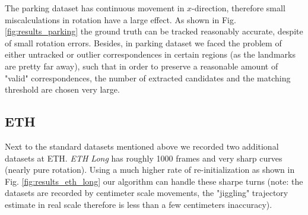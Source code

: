 \documentclass[letterpaper, 12 pt]{article}
\begin{document}
\begin{multicols*}{2}
The parking dataset has continuous movement in $x$-direction, therefore small miscalculations in rotation have a large effect. As shown in Fig. \ref{fig:results_parking} the ground truth can be tracked reasonably accurate, despite of small rotation errors. Besides, in parking dataset we faced the problem of either untracked or outlier correspondences in certain regions (as the landmarks are pretty far away), such that in order to preserve a reasonable amount of "valid" correspondences, the number of extracted candidates and the matching threshold are chosen very large.

\subsection{ETH}
Next to the standard datasets mentioned above we recorded two additional datasets at ETH. \textit{ETH Long} has roughly 1000 frames and very sharp curves (nearly pure rotation). Using a much higher rate of re-initialization as shown in Fig. \ref{fig:results_eth_long} our algorithm can handle these sharpe turns (note: the datasets are recorded by centimeter scale movements, the "jiggling" trajectory estimate in real scale therefore is less than a few centimeters inaccuracy).


\end{multicols*}
\end{document}
